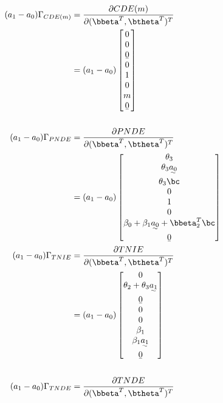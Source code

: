 \documentclass[10pt]{article}
\begin{document}
\begin{align*}
  (a_{1}-a_{0})\Gamma_{CDE(m)}
  &= \frac{\partial CDE(m)}{\partial (\bbeta^{T},\btheta^{T})^{T}}\\
  &= (a_{1}-a_{0})
    \begin{bmatrix}
      0\\
      0\\
      \b0\\
      0\\
      1\\
      0\\
      m\\
      \b0\\
    \end{bmatrix}\\
  \\
  (a_{1}-a_{0})\Gamma_{PNDE}
  &= \frac{\partial PNDE}{\partial (\bbeta^{T},\btheta^{T})^{T}}\\
  &= (a_{1}-a_{0})
    \begin{bmatrix}
      \theta_{3}\\
      \theta_{3}\uwave{a_{0}}\\
      \theta_{3}\bc\\
      0\\
      1\\
      0\\
      \beta_{0} + \beta_{1}\uwave{a_{0}} + \bbeta_{2}^{T}\bc\\
      \b0\\
    \end{bmatrix}\\
  (a_{1}-a_{0})\Gamma_{TNIE}
  &= \frac{\partial TNIE}{\partial (\bbeta^{T},\btheta^{T})^{T}}\\
  &= (a_{1}-a_{0})
    \begin{bmatrix}
      0\\
      \theta_{2} + \theta_{3}\uwave{a_{1}}\\
      \b0\\
      0\\
      0\\
      \beta_{1}\\
      \beta_{1}\uwave{a_{1}}\\
      \b0\\
    \end{bmatrix}\\
  \\
  (a_{1}-a_{0})\Gamma_{TNDE}
  &= \frac{\partial TNDE}{\partial (\bbeta^{T},\btheta^{T})^{T}}\\

\end{align*}
\end{document}
